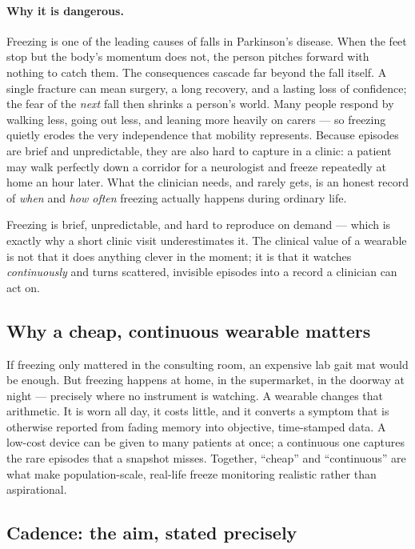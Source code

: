 \paragraph{Why it is dangerous.} Freezing is one of the leading causes of falls in
Parkinson's disease. When the feet stop but the body's momentum does not, the person
pitches forward with nothing to catch them. The consequences cascade far beyond the
fall itself. A single fracture can mean surgery, a long recovery, and a lasting loss
of confidence; the fear of the \emph{next} fall then shrinks a person's world. Many
people respond by walking less, going out less, and leaning more heavily on carers ---
so freezing quietly erodes the very independence that mobility represents. Because
episodes are brief and unpredictable, they are also hard to capture in a clinic: a
patient may walk perfectly down a corridor for a neurologist and freeze repeatedly at
home an hour later. What the clinician needs, and rarely gets, is an honest record of
\emph{when} and \emph{how often} freezing actually happens during ordinary life.

\begin{keyidea}
Freezing is brief, unpredictable, and hard to reproduce on demand --- which is exactly
why a short clinic visit underestimates it. The clinical value of a wearable is not
that it does anything clever in the moment; it is that it watches \emph{continuously}
and turns scattered, invisible episodes into a record a clinician can act on.
\end{keyidea}

\subsection{Why a cheap, continuous wearable matters}

If freezing only mattered in the consulting room, an expensive lab gait mat would be
enough. But freezing happens at home, in the supermarket, in the doorway at night ---
precisely where no instrument is watching. A wearable changes that arithmetic. It is
worn all day, it costs little, and it converts a symptom that is otherwise reported
from fading memory into objective, time-stamped data. A low-cost device can be given to
many patients at once; a continuous one captures the rare episodes that a snapshot
misses. Together, ``cheap'' and ``continuous'' are what make population-scale, real-life
freeze monitoring realistic rather than aspirational.

\subsection{Cadence: the aim, stated precisely}

